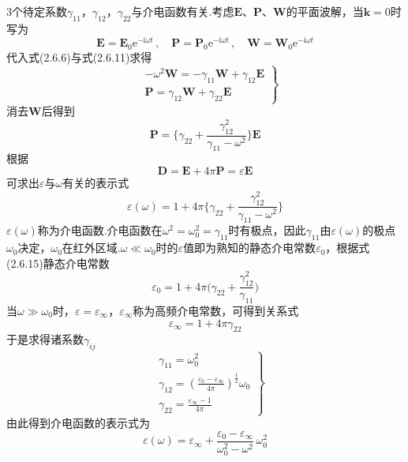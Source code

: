 3个待定系数$\gamma_{11}$，$\gamma_{12}$，$\gamma_{22}$与介电函数有关.考虑$\boldsymbol{E}$、$\boldsymbol{P}$、$\boldsymbol{W}$的平面波解，当$\boldsymbol{k}=0$时写为
\begin{equation}
  \boldsymbol{E}=\boldsymbol{E}_0\mathrm{e}^{-\mathrm{i}\omega t}\,,\quad
  \boldsymbol{P}=\boldsymbol{P}_0\mathrm{e}^{-\mathrm{i}\omega t}\,,\quad
  \boldsymbol{W}=\boldsymbol{W}_0\mathrm{e}^{-\mathrm{i}\omega t}
\end{equation}
代入式(2.6.6)与式(2.6.11)求得
\begin{equation}
\left.\begin{aligned}
  &-\omega^2\boldsymbol{W}=-\gamma_{11}\boldsymbol{W}+\gamma_{12}\boldsymbol{E}\\
  &\boldsymbol{P}=\gamma_{12}\boldsymbol{W}+\gamma_{22}\boldsymbol{E}
\end{aligned}\right\}
\end{equation}
消去$\boldsymbol{W}$后得到
\begin{equation}
  \boldsymbol{P}=\biggl\{\gamma_{22}+\frac{\gamma_{12}^2}{\gamma_{11}-\omega^2}\biggr\}\boldsymbol{E}
\end{equation}
根据
\begin{equation*}
  \boldsymbol{D}=\boldsymbol{E}+4\pi\boldsymbol{P}=\varepsilon\boldsymbol{E}
\end{equation*}
可求出$\varepsilon$与$\omega$有关的表示式
\begin{equation}
  \varepsilon(\omega)=1+4\pi\biggl\{\gamma_{22}
  +\frac{\gamma_{12}^2}{\gamma_{11}-\omega^2}\biggr\}
\end{equation}
$\varepsilon(\omega)$称为介电函数.介电函数在$\omega^2=\omega_0^2=\gamma_{11}$时有极点，因此$\gamma_{11}$由$\varepsilon(\omega)$的极点$\omega_0$决定，$\omega_0$在红外区域.$\omega\ll\omega_0$时的$\varepsilon$值即为熟知的静态介电常数$\varepsilon_0$，根据式(2.6.15)静态介电常数
\begin{equation}
  \varepsilon_0=1+4\pi\Biggl(\gamma_{22}+\frac{\gamma_{12}^2}{\gamma_{11}}\Biggr)
\end{equation}
当$\omega\gg\omega_0$时，$\varepsilon=\varepsilon_{\infty}$，$\varepsilon_{\infty}$称为高频介电常数，可得到关系式
\begin{equation}
  \varepsilon_{\infty}=1+4\pi\gamma_{22}
\end{equation}
于是求得诸系数$\gamma_{ij}$
\begin{equation}
\left.\begin{aligned}
  &\gamma_{11}=\omega_0^2\\
  &\gamma_{12}=\left(\frac{\varepsilon_0-\varepsilon_{\infty}}{4\pi}\right)^{\frac{1}{2}}\omega_0\\
  &\gamma_{22}=\frac{\varepsilon_{\infty}-1}{4\pi}
\end{aligned}\right\}
\end{equation}
由此得到介电函数的表示式为
\begin{equation}
  \varepsilon(\omega)=\varepsilon_{\infty}
  +\frac{\varepsilon_0-\varepsilon_{\infty}}{\omega_0^2-\omega^2}\,\omega_0^2
\end{equation}


